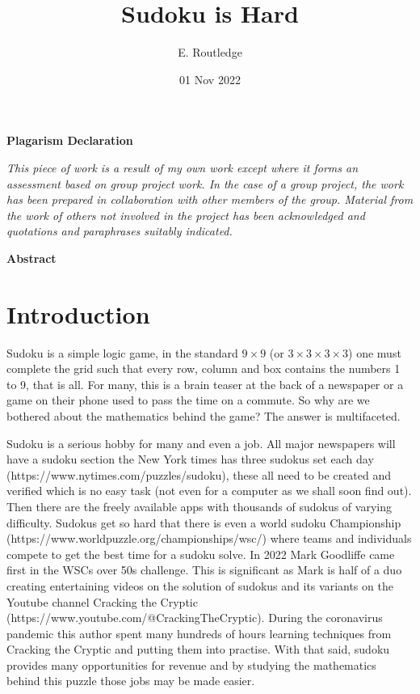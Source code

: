 \documentclass[a4paper,11pt]{report}
\author{E. Routledge}
\date{01 Nov 2022}
\title{Sudoku is Hard}
\newcounter{row}
\newcounter{col}
\begin{document}
\lstset{language=Python}

\begin{center}{\huge\textbf{Plagarism Declaration}}\end{center}
\textit{This piece of work is a result of my own work except where it forms an assessment based on group project work. In the case of a group project, the work has been prepared in collaboration with other members of the group. Material from the work of others not involved in the project has been acknowledged and quotations and paraphrases suitably indicated.}
\begin{center}{\textbf{Abstract}}\end{center}

\tableofcontents
\chapter{Introduction}

Sudoku is a simple logic game, in the standard $9 \times 9$ (or $3 \times 3 \times 3 \times 3$) one must complete the grid such that every row, column and box contains the numbers 1 to 9, that is all. For many, this is a brain teaser at the back of a newspaper or a game on their phone used to pass the time on a commute. So why are we bothered about the mathematics behind the game? The answer is multifaceted. 

Sudoku is a serious hobby for many and even a job. All major newspapers will have a sudoku section the New York times has three sudokus set each day (https://www.nytimes.com/puzzles/sudoku), these all need to be created and verified which is no easy task (not even for a computer as we shall soon find out). Then there are the freely available apps with thousands of sudokus of varying difficulty. Sudokus get so hard that there is even a world sudoku Championship (https://www.worldpuzzle.org/championships/wsc/) where teams and individuals compete to get the best time for a sudoku solve. In 2022 Mark Goodliffe came first in the WSCs over 50s challenge. This is significant as Mark is half of a duo creating entertaining videos on the solution of sudokus and its variants on the Youtube channel Cracking the Cryptic (https://www.youtube.com/@CrackingTheCryptic). During the coronavirus pandemic this author spent many hundreds of hours learning techniques from Cracking the Cryptic and putting them into practise. With that said, sudoku provides many opportunities for revenue and by studying the mathematics behind this puzzle those jobs may be made easier.
\end{document}
